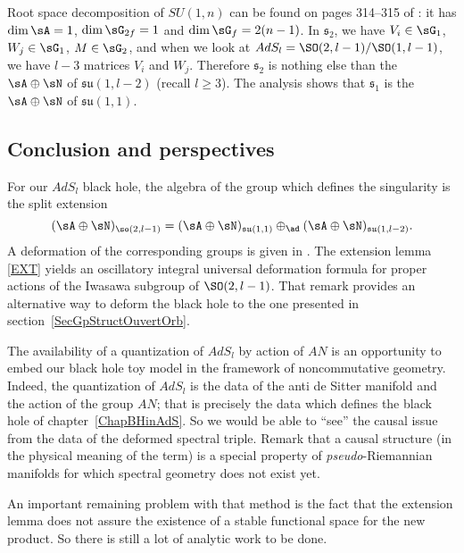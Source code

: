 Root space decomposition of $SU(1,n)$ can be found on pages 314--315 of \cite{Knapp}: it has $\dim\sA=1$, $\dim\sG_{2f}=1$ and $\dim\sG_f=2(n-1)$. In $\mathfrak{s}_2$, we have $V_i\in\sG_1$, $W_j\in\sG_1$, $M\in\sG_2$, and when we look at $AdS_l=\SO(2,l-1)/\SO(1,l-1)$, we have $l-3$ matrices $V_i$ and $W_j$. Therefore $\mathfrak{s}_2$ is nothing else than the $\sA\oplus\sN$ of $\mathfrak{su}(1,l-2)$ (recall $l\geq3$). The analysis shows that $\mathfrak{s}_1$ is the $\sA\oplus\sN$ of $\mathfrak{su}(1,1)$.

\subsection{Conclusion and perspectives}

For our $AdS_l$ black hole, the algebra of the group which defines the singularity is the split extension
\[
	(\sA\oplus\sN)_{\so(2,l-1)}=(\sA\oplus\sN)_{\mathfrak{su}(1,1)}\oplus_{\ad}(\sA\oplus\sN)_{\mathfrak{su}(1,l-2)}.
\]
A deformation of the corresponding groups is given in \cite{Biel-Massar}. The extension lemma \ref{EXT} yields an oscillatory integral universal deformation formula for proper actions of the Iwasawa subgroup of $\SO(2,l-1)$. That remark provides an alternative way to deform the black hole to the one presented in section~\ref{SecGpStructOuvertOrb}.

The availability of a quantization of $AdS_l$ by action of $AN$ is an opportunity to embed our black hole toy model in the framework of noncommutative geometry. Indeed, the quantization of $AdS_l$ is the data of the anti de Sitter manifold and the action of the group $AN$; that is precisely the data which defines the black hole of chapter~\ref{ChapBHinAdS}. So we would be able to ``see'' the causal issue from the data of the deformed spectral triple. Remark that a causal structure (in the physical meaning of the term) is a special property of \emph{pseudo}-Riemannian manifolds for which spectral geometry does not exist yet.

An important remaining problem with that method is the fact that the extension lemma does not assure the existence of a stable functional space for the new product. So there is still a lot of analytic work to be done.
